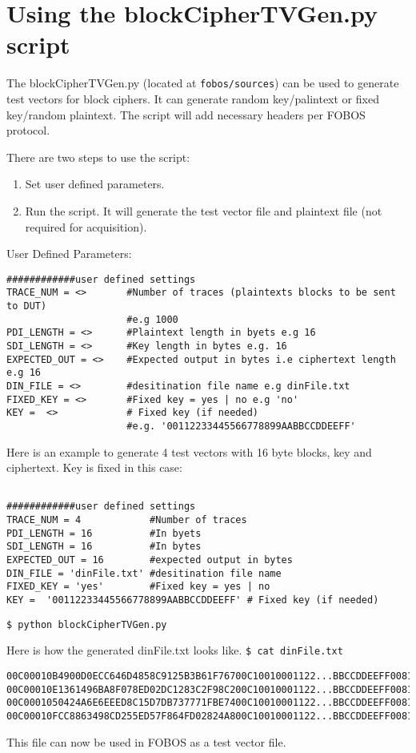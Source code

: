 \section {Using the blockCipherTVGen.py script}

The blockCipherTVGen.py (located at \texttt{fobos/sources}) can be used to generate test vectors for block ciphers.
It can generate random key/palintext or fixed key/random plaintext. The script will add necessary headers per FOBOS protocol.

There are two steps to use the script:
\begin{enumerate}
 \item Set user defined parameters.
 \item Run the script. It will generate the test vector file and plaintext file (not required for acquisition).
\end{enumerate}

User Defined Parameters:
\begin{verbatim}
############user defined settings
TRACE_NUM = <>       #Number of traces (plaintexts blocks to be sent to DUT)
                     #e.g 1000
PDI_LENGTH = <>      #Plaintext length in byets e.g 16
SDI_LENGTH = <>      #Key length in bytes e.g. 16
EXPECTED_OUT = <>    #Expected output in bytes i.e ciphertext length e.g 16
DIN_FILE = <>        #desitination file name e.g dinFile.txt
FIXED_KEY = <>       #Fixed key = yes | no e.g 'no'
KEY =  <>            # Fixed key (if needed) 
                     #e.g. '00112233445566778899AABBCCDDEEFF' 
\end{verbatim}

Here is an example to generate 4 test vectors with 16 byte blocks, key and ciphertext. Key is fixed in this case:
\begin{verbatim}

############user defined settings
TRACE_NUM = 4            #Number of traces
PDI_LENGTH = 16          #In byets
SDI_LENGTH = 16          #In bytes
EXPECTED_OUT = 16        #expected output in bytes
DIN_FILE = 'dinFile.txt' #desitination file name
FIXED_KEY = 'yes'        #Fixed key = yes | no
KEY =  '00112233445566778899AABBCCDDEEFF' # Fixed key (if needed)
\end{verbatim}

\texttt{\$ python blockCipherTVGen.py }

Here is how the generated dinFile.txt looks like. 
\texttt{\$ cat dinFile.txt }
\begin{verbatim}
00C00010B4900D0ECC646D4858C9125B3B61F76700C10010001122...BBCCDDEEFF0081001000800001
00C00010E1361496BA8F078ED02DC1283C2F98C200C10010001122...BBCCDDEEFF0081001000800001
00C0001050424A6E6EEED8C15D7DB737771FBE7400C10010001122...BBCCDDEEFF0081001000800001
00C00010FCC8863498CD255ED57F864FD02824A800C10010001122...BBCCDDEEFF0081001000800001
\end{verbatim}

This file can now be used in FOBOS as a test vector file.